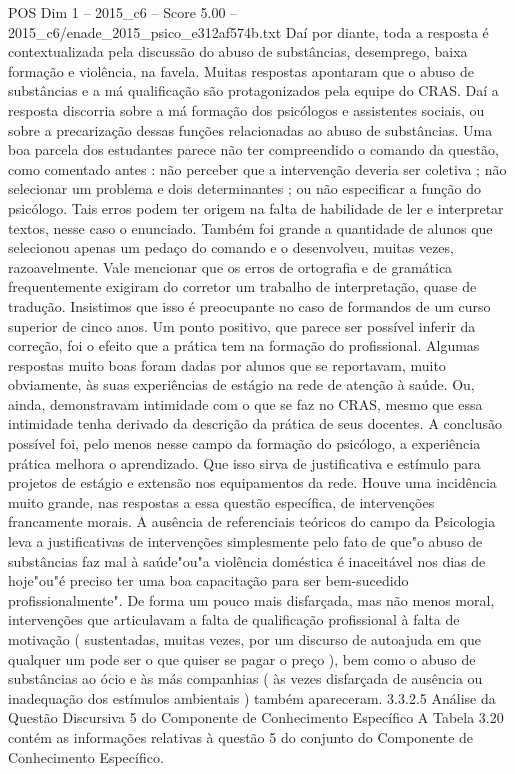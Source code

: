 \begin{textsample}{POS Dim 1 – 2015\_c6 – Score 5.00 – 2015\_c6/enade\_2015\_psico\_e312af574b.txt}
Daí por diante, toda a resposta é contextualizada pela discussão do abuso de substâncias, desemprego, baixa formação e violência, na favela.
Muitas respostas apontaram que o abuso de substâncias e a má qualificação são protagonizados pela equipe do CRAS.
Daí a resposta discorria sobre a má formação dos psicólogos e assistentes sociais, ou sobre a precarização dessas funções relacionadas ao abuso de substâncias.
Uma boa parcela dos estudantes parece não ter compreendido o comando da questão, como comentado antes : não perceber que a intervenção deveria ser coletiva ; não selecionar um problema e dois determinantes ; ou não especificar a função do psicólogo.
Tais erros podem ter origem na falta de habilidade de ler e interpretar textos, nesse caso o enunciado.
Também foi grande a quantidade de alunos que selecionou apenas um pedaço do comando e o desenvolveu, muitas vezes, razoavelmente.
Vale mencionar que os erros de ortografia e de gramática frequentemente exigiram do corretor um trabalho de interpretação, quase de tradução.
Insistimos que isso é preocupante no caso de formandos de um curso superior de cinco anos.
Um ponto positivo, que parece ser possível inferir da correção, foi o efeito que a prática tem na formação do profissional.
Algumas respostas muito boas foram dadas por alunos que se reportavam, muito obviamente, às suas experiências de estágio na rede de atenção à saúde.
Ou, ainda, demonstravam intimidade com o que se faz no CRAS, mesmo que essa intimidade tenha derivado da descrição da prática de seus docentes.
A conclusão possível foi, pelo menos nesse campo da formação do psicólogo, a experiência prática melhora o aprendizado.
Que isso sirva de justificativa e estímulo para projetos de estágio e extensão nos equipamentos da rede.
Houve uma incidência muito grande, nas respostas a essa questão específica, de intervenções francamente morais.
A ausência de referenciais teóricos do campo da Psicologia leva a justificativas de intervenções simplesmente pelo fato de que"o abuso de substâncias faz mal à saúde"ou"a violência doméstica é inaceitável nos dias de hoje"ou"é preciso ter uma boa capacitação para ser bem-sucedido profissionalmente".
De forma um pouco mais disfarçada, mas não menos moral, intervenções que articulavam a falta de qualificação profissional à falta de motivação ( sustentadas, muitas vezes, por um discurso de autoajuda em que qualquer um pode ser o que quiser se pagar o preço ), bem como o abuso de substâncias ao ócio e às más companhias ( às vezes disfarçada de ausência ou inadequação dos estímulos ambientais ) também apareceram. 3.3.2.5 Análise da Questão Discursiva 5 do Componente de Conhecimento Específico A Tabela 3.20 contém as informações relativas à questão 5 do conjunto do Componente de Conhecimento Específico.

\end{textsample}
